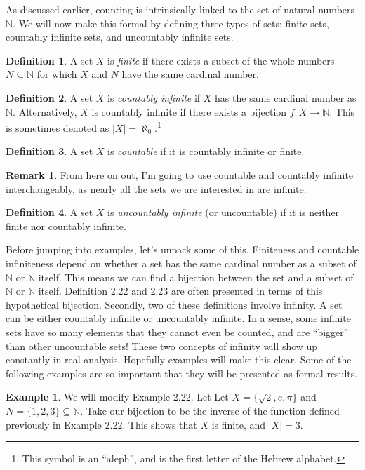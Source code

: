 \documentclass{article}
\newcommand{\N}{\mathbb{N}}
\theoremstyle{definition}
\newtheorem{definition}{Definition}[section]
\newtheorem{example}{Example}[section]
\newtheorem{remark}{Remark}[section]
\begin{document}
As discussed earlier, counting is intrinsically linked to the set of natural numbers $ \N $. We will now make this formal by defining three types of sets: finite sets, countably infinite sets, and uncountably infinite sets.
\begin{definition}
	A set $ X $ is \textit{\color{red}finite} if there exists a subset of the whole numbers $ N\subseteq \N $ for which $ X $ and $ N $ have the same cardinal number.
\end{definition} 
\begin{definition}
	A set $ X $ is \textit{\color{red}countably infinite} if $ X $ has the same cardinal number as $ \N $. Alternatively, $ X $ is countably infinite if there exists a bijection $ f:X\to\N $. This is sometimes denoted as $ |X|=\aleph_0 $.\footnote{This symbol is an ``aleph'', and is the first letter of the Hebrew alphabet.} 
\end{definition}
\begin{definition}
	A set $ X $ is \textit{\color{red}countable} if it is countably infinite or finite.
\end{definition}
\begin{remark}
	From here on out, I'm going to use countable and countably infinite interchangeably, as nearly all the sets we are interested in are infinite.  
\end{remark}
\begin{definition}
	A set $ X $ is  \textit{\color{red}uncountably infinite} (or uncountable) if it is neither finite nor countably infinite.
\end{definition}
Before jumping into examples, let's unpack some of this. Finiteness and countable infiniteness depend on whether a set has the same cardinal number as a subset of $ \N $ or $ \N $ itself. This means we can find a bijection between the set and a subset of $ \N $ or $ \N $ itself. Definition 2.22 and 2.23 are often presented in terms of this hypothetical bijection. Secondly, two of these definitions involve infinity. A set can be either countably infinite or uncountably infinite. In a sense, some infinite sets have so many elements that they cannot even be counted, and are ``bigger'' than other uncountable sets! These two concepts of infinity will show up constantly in real analysis. Hopefully examples will make this clear. Some of the following examples are so important that they will be presented as formal results. 
\begin{example}
 We will modify Example 2.22. Let Let $ X=\{\sqrt{2},e,\pi\} $ and $ N=\{1,2,3\}\subseteq \N$. Take our bijection to be the inverse of the function defined previously in Example 2.22. This shows that $ X $ is finite, and $ |X|=3 $. 
\end{example}
\end{document}

